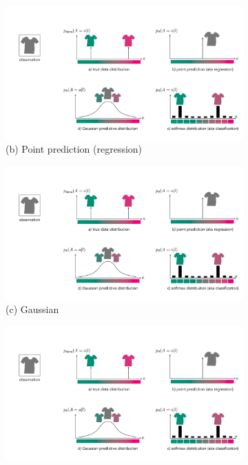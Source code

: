 \begin{figure}
{\begin{minipage}{0.84\linewidth}
\begin{subfigure}[b]{0.5\textwidth}
                \includegraphics[width=1.0\linewidth]{./figures/conditional_generative_models/cgen_tshirts_point.pdf}
                \caption*{(b) Point prediction (regression)}
                \vspace{0.4cm}
            \end{subfigure}
            \hfill
            \begin{subfigure}[b]{0.5\textwidth}
                \includegraphics[width=1.0\linewidth]{./figures/conditional_generative_models/cgen_tshirts_gauss.pdf}
                \caption*{(c) Gaussian}
            \end{subfigure}
            \hfill
            \begin{subfigure}[b]{0.5\textwidth}
                \includegraphics[width=1.0\linewidth]{./figures/conditional_generative_models/cgen_tshirts_class.pdf}

\end{subfigure}
\end{minipage}}
\end{figure}
